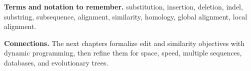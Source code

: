\documentclass[11pt,letterpaper]{article}
\begin{document}
{\footnotesize
\textbf{Terms and notation to remember.} substitution, insertion, deletion, indel, substring, subsequence, alignment, similarity, homology, global alignment, local alignment.

\textbf{Connections.} The next chapters formalize edit and similarity objectives with dynamic programming, then refine them for space, speed, multiple sequences, databases, and evolutionary trees.
}
\end{document}
